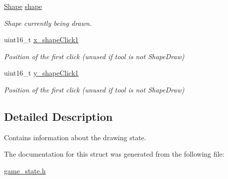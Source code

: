 \begin{DoxyCompactItemize}
\mbox{\hyperlink{group__canvas_ga55b506070847a13554f8b879c1bfb37c}{Shape}} \mbox{\hyperlink{group__game__state_ga303447063e848e099650034c763724d7}{shape}}
\begin{DoxyCompactList}\small\item\em Shape currently being drawn. \end{DoxyCompactList}\item 
uint16\+\_\+t \mbox{\hyperlink{group__game__state_ga2e0a42da2415d5aa408c1bb6f6f5e4c7}{x\+\_\+shape\+Click1}}
\begin{DoxyCompactList}\small\item\em Position of the first click (unused if tool is not Shape\+Draw) \end{DoxyCompactList}\item 
uint16\+\_\+t \mbox{\hyperlink{group__game__state_ga9c366a1e61752594e2755c01c9c43dd6}{y\+\_\+shape\+Click1}}
\begin{DoxyCompactList}\small\item\em Position of the first click (unused if tool is not Shape\+Draw) \end{DoxyCompactList}\end{DoxyCompactItemize}


\subsection{Detailed Description}
Contains information about the drawing state. 

The documentation for this struct was generated from the following file\+:\begin{DoxyCompactItemize}
\item 
\mbox{\hyperlink{game__state_8h}{game\+\_\+state.\+h}}\end{DoxyCompactItemize}
